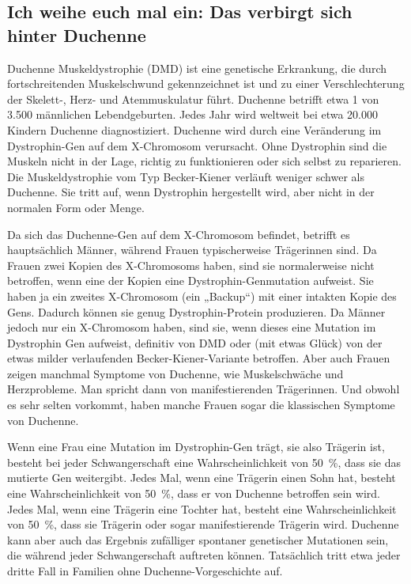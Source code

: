 \documentclass[fontsize=14pt,a4paper,headinclude,DIV=calc,automark]{scrbook}
\begin{document}
\subsection{Ich weihe euch mal ein: Das verbirgt sich hinter Duchenne}
\label{sec:muskeldystrophie}

Duchenne Muskeldystrophie (DMD) ist eine genetische Erkrankung, die durch fortschreitenden Muskelschwund gekennzeichnet ist und zu einer Verschlechterung der Skelett-, Herz- und Atemmuskulatur führt. Duchenne betrifft etwa 1 von 3.500 männlichen Lebendgeburten. Jedes Jahr wird weltweit bei etwa 20.000 Kindern Duchenne diagnostiziert. Duchenne wird durch eine Veränderung im Dystrophin-Gen auf dem X-Chromosom verursacht. Ohne Dystrophin sind die Muskeln nicht in der Lage, richtig zu funktionieren oder sich selbst zu reparieren. Die Muskeldystrophie vom Typ Becker-Kiener verläuft weniger schwer als Duchenne. Sie tritt auf, wenn Dystrophin hergestellt wird, aber nicht in der normalen Form oder Menge.

Da sich das Duchenne-Gen auf dem X-Chromosom befindet, betrifft es hauptsächlich Männer, während Frauen typischerweise Trägerinnen sind. Da Frauen zwei Kopien des X-Chromosoms haben, sind sie normalerweise nicht betroffen, wenn eine der Kopien eine Dystrophin-Genmutation aufweist. Sie haben ja ein zweites X-Chromosom (ein „Backup“) mit einer intakten Kopie des Gens. Dadurch können sie genug Dystrophin-Protein produzieren. Da Männer jedoch nur ein X-Chromosom haben, sind sie, wenn dieses eine Mutation im Dystrophin Gen aufweist, definitiv von DMD oder (mit etwas Glück) von der etwas milder verlaufenden Becker-Kiener-Variante betroffen. Aber auch Frauen zeigen manchmal Symptome von Duchenne, wie Muskelschwäche und Herzprobleme. Man spricht dann von manifestierenden Trägerinnen. Und obwohl es sehr selten vorkommt, haben manche Frauen sogar die klassischen Symptome von Duchenne.

Wenn eine Frau eine Mutation im Dystrophin-Gen trägt, sie also Trägerin ist, besteht bei jeder Schwangerschaft eine Wahrscheinlichkeit von 50~\%, dass sie das mutierte Gen weitergibt. Jedes Mal, wenn eine Trägerin einen Sohn hat, besteht eine Wahrscheinlichkeit von 50~\%, dass er von Duchenne betroffen sein wird. Jedes Mal, wenn eine Trägerin eine Tochter hat, besteht eine Wahrscheinlichkeit von 50~\%, dass sie Trägerin oder sogar manifestierende Trägerin wird. Duchenne kann aber auch das Ergebnis zufälliger spontaner genetischer Mutationen sein, die während jeder Schwangerschaft auftreten können. Tatsächlich tritt etwa jeder dritte Fall in Familien ohne Duchenne-Vorgeschichte auf.
\end{document}
